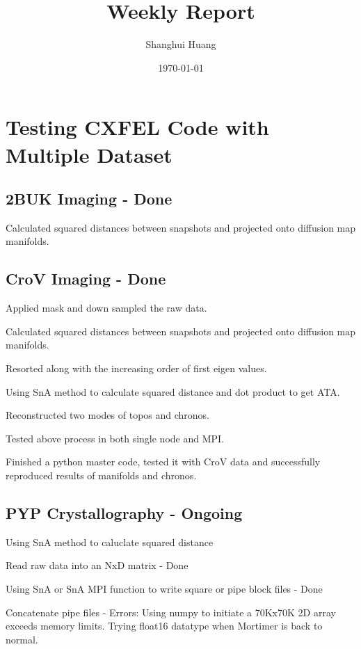 \documentclass{article}
\title{Weekly Report} %
\author{Shanghui Huang} %
\date{\today} %
\begin{document}
\maketitle

\section*{Testing CXFEL Code with Multiple Dataset}
\subsection*{2BUK Imaging - Done}
Calculated squared distances between snapshots and projected onto diffusion map manifolds.

\subsection*{CroV Imaging - Done}
\noindent Applied mask and down sampled the raw data.

\noindent Calculated squared distances between snapshots and projected onto diffusion map manifolds.

\noindent Resorted along with the increasing order of first eigen values.

\noindent Using SnA method to calculate squared distance and dot product to get ATA.

\noindent Reconstructed two modes of topos and chronos.

\noindent Tested above process in both single node and MPI.

\noindent Finished a python master code, tested it with CroV data and successfully reproduced results of manifolds and chronos.

\subsection*{PYP Crystallography - Ongoing}
Using SnA method to caluclate squared distance

Read raw data into an NxD matrix - Done

Using SnA or SnA MPI function to write square or pipe block files - Done

\begin{adjustwidth}{\parindent}{}
Concatenate pipe files - Errors: Using numpy to initiate a 70Kx70K 2D array exceeds memory limits. Trying float16 datatype when Mortimer is back to normal.
\end{adjustwidth}
\end{document}
